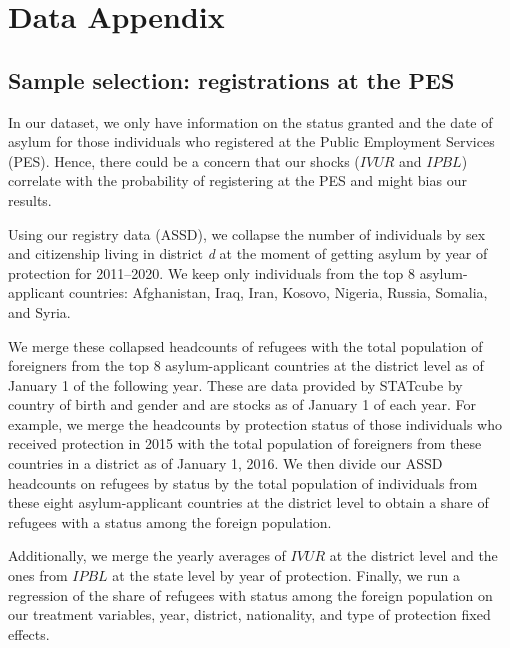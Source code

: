 \clearpage
\section{Data Appendix} \label{sec:appendixb}
\subsection{Sample selection: registrations at the PES}\label{subsec:pes_selection}
In our dataset, we only have information on the status granted and the date of asylum for those individuals who registered at the Public Employment Services (PES). Hence, there could be a concern that our shocks ($IVUR$ and $IPBL$) correlate with the probability of registering at the PES and might bias our results.

Using our registry data (ASSD), we collapse the number of individuals by sex and citizenship living in district \textit{d} at the moment of getting asylum by year of protection for 2011--2020. We keep only individuals from the top 8 asylum-applicant countries: Afghanistan, Iraq, Iran, Kosovo, Nigeria, Russia, Somalia, and Syria. 

We merge these collapsed headcounts of refugees with the total population of foreigners from the top 8 asylum-applicant countries at the district level as of January 1 of the following year. These are data provided by STATcube by country of birth and gender and are stocks as of January 1 of each year. For example, we merge the headcounts by protection status of those individuals who received protection in 2015 with the total population of foreigners from these countries in a district as of January 1, 2016. We then divide our ASSD headcounts on refugees by status by the total population of individuals from these eight asylum-applicant countries at the district level to obtain a share of refugees with a status among the foreign population.

Additionally, we merge the yearly averages of $IVUR$ at the district level and the ones from $IPBL$ at the state level by year of protection.
Finally, we run a regression of the share of refugees with status among the foreign population on our treatment variables, year, district, nationality, and type of protection fixed effects. 

